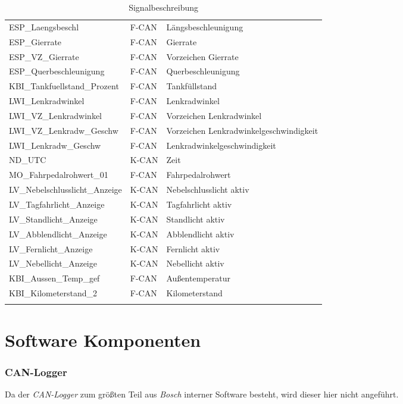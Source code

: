 \begin{longtable}{@{\extracolsep{\fill}}|l|l|l|@{}}
    ESP\_Laengsbeschl & F-CAN & Längsbeschleunigung \\
    ESP\_Gierrate & F-CAN & Gierrate \\
    ESP\_VZ\_Gierrate & F-CAN & Vorzeichen Gierrate \\
    ESP\_Querbeschleunigung & F-CAN & Querbeschleunigung \\
    KBI\_Tankfuellstand\_Prozent & F-CAN & Tankfüllstand \\
    LWI\_Lenkradwinkel & F-CAN & Lenkradwinkel \\
    LWI\_VZ\_Lenkradwinkel & F-CAN & Vorzeichen Lenkradwinkel \\
    LWI\_VZ\_Lenkradw\_Geschw & F-CAN & Vorzeichen Lenkradwinkelgeschwindigkeit \\
    LWI\_Lenkradw\_Geschw & F-CAN & Lenkradwinkelgeschwindigkeit \\
    ND\_UTC & K-CAN & Zeit \\
    MO\_Fahrpedalrohwert\_01 & F-CAN & Fahrpedalrohwert \\
    LV\_Nebelschlusslicht\_Anzeige & K-CAN & Nebelschlusslicht aktiv \\
    LV\_Tagfahrlicht\_Anzeige & K-CAN & Tagfahrlicht aktiv \\
    LV\_Standlicht\_Anzeige & K-CAN & Standlicht aktiv \\
    LV\_Abblendlicht\_Anzeige & K-CAN & Abblendlicht aktiv \\
    LV\_Fernlicht\_Anzeige & K-CAN & Fernlicht aktiv \\
    LV\_Nebellicht\_Anzeige & K-CAN & Nebellicht aktiv \\
    KBI\_Aussen\_Temp\_gef & F-CAN & Außentemperatur \\
    KBI\_Kilometerstand\_2 & F-CAN & Kilometerstand \\
    \hline
	\caption{Signalbeschreibung}
	\label{tab:full_can_signals}
\end{longtable}

\section{Software Komponenten}

\subsubsection{CAN-Logger}

Da der \textit{CAN-Logger} zum größten Teil aus \textit{Bosch} interner Software besteht, wird dieser hier nicht angeführt.

